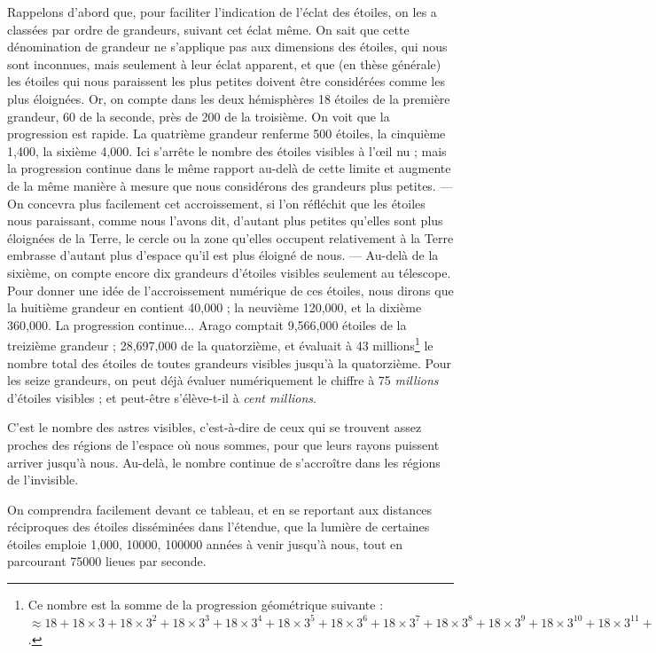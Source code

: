 \documentclass[a4paper, 11pt, oneside]{article}
\begin{document}
Rappelons d'abord que, pour faciliter l'indication de l'éclat des étoiles, on les a classées par ordre de grandeurs, suivant cet éclat même. On sait que cette dénomination de grandeur ne s'applique pas aux dimensions des étoiles, qui nous sont inconnues, mais seulement à leur éclat apparent, et que (en thèse générale) les étoiles qui nous paraissent les plus petites doivent être considérées comme les plus éloignées. Or, on compte dans les deux hémisphères 18 étoiles de la première grandeur, 60 de la seconde, près de 200 de la troisième. On voit que la progression est rapide. La quatrième grandeur renferme 500 étoiles, la cinquième 1,400, la sixième 4,000. Ici s'arrête le nombre des étoiles visibles à l'œil nu ; mais la progression continue dans le même rapport au-delà de cette limite et augmente de la même manière à mesure que nous considérons des grandeurs plus petites. --- On concevra plus facilement cet accroissement, si l'on réfléchit que les étoiles nous paraissant, comme nous l'avons dit, d'autant plus petites qu'elles sont plus éloignées de la Terre, le cercle ou la zone qu'elles occupent relativement à la Terre embrasse d'autant plus d'espace qu'il est plus éloigné de nous. --- Au-delà de la sixième, on compte encore dix grandeurs d'étoiles visibles seulement au télescope. Pour donner une idée de l'accroissement numérique de ces étoiles, nous dirons que la huitième grandeur en contient 40,000 ; la neuvième 120,000, et la dixième 360,000. La progression continue... Arago comptait 9,566,000 étoiles de la treizième grandeur ; 28,697,000 de la quatorzième, et évaluait à 43 millions\footnote{Ce nombre est la somme de la progression géométrique suivante : $\approx 18 + 18 \times 3 + 18 \times 3^2 + 18 \times 3^3 + 18 \times 3^4 + 18 \times 3^5 + 18 \times 3^6 + 18 \times 3^7 + 18 \times 3^8 + 18 \times 3^9 + 18 \times 3^{10} + 18 \times 3^{11} + 18 \times 3^{12} + 18 \times 3^{13}$.} le nombre total des étoiles de toutes grandeurs visibles jusqu'à la quatorzième. Pour les seize grandeurs, on peut déjà évaluer numériquement le chiffre à 75 \emph{millions} d'étoiles visibles ; et peut-être s'élève-t-il à \emph{cent millions}.

C'est le nombre des astres visibles, c'est-à-dire de ceux qui se trouvent assez proches des régions de l'espace où nous sommes, pour que leurs rayons puissent arriver jusqu'à nous. Au-delà, le nombre continue de s'accroître dans les régions de l'invisible.

On comprendra facilement devant ce tableau, et en se reportant aux distances réciproques des étoiles disséminées dans l'étendue, que la lumière de certaines étoiles emploie 1,000, 10000, 100000 années à venir jusqu'à nous, tout en parcourant 75000 lieues par seconde.
\end{document}
